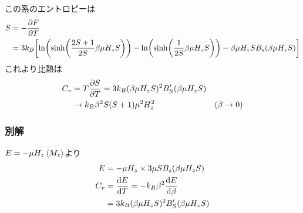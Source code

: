 \documentclass[../../master.tex]{subfiles}
\begin{document}
\subsection{}
この系のエントロピーは
\begin{align}
    S &= -\pdv{F}{T}\\
    &= 3k_B\qty[
        \ln(\sinh(\dfrac{2S+1}{2S}\beta\mu H_z S))-\ln(\sinh(\dfrac{1}{2S}\beta\mu H_z S))
        -\beta\mu H_z S B_s(\beta\mu H_z S)]
\end{align}
これより比熱は
\begin{align}
    C_v &= T\pdv{S}{T} = 3k_B(\beta\mu H_z S)^2 B_S'(\beta\mu H_zS)\\
        &\to k_B \beta^2 S(S+1)\mu^2 H_z^2 &(\beta\to 0)
\end{align}

\subsubsection*{別解}
\(E = -\mu H_z \ev{M_z}\)より
\begin{align}
    E &= -\mu H_z \times 3\mu S B_s(\beta \mu H_z S)\\
    C_v &= \dv{E}{T} = -k_B \beta^2 \dv{E}{\beta} \\
    &= 3k_B(\beta\mu H_z S)^2 B_S'(\beta\mu H_zS)
\end{align}
\end{document}
